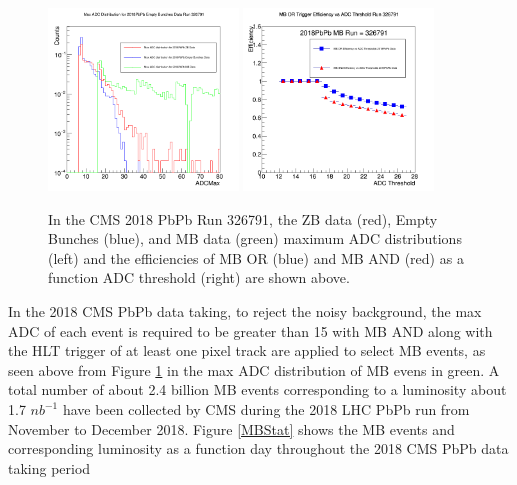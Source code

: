 \begin{figure}[hbtp]
\begin{center}
\includegraphics[width=0.45\textwidth]{Figures/Chapter3/MaxADC.png}
\includegraphics[width=0.45\textwidth]{Figures/Chapter3/MBTrgEffADC.png}
\caption{In the CMS 2018 PbPb Run 326791, the ZB data (red), Empty Bunches (blue), and MB data (green) maximum ADC distributions (left) and the efficiencies of MB OR (blue) and MB AND (red) as a function ADC threshold (right) are shown above.}
\label{2018PbPbMB}
\end{center}
\end{figure} 

In the 2018 CMS PbPb data taking, to reject the noisy background, the max ADC of each event is required to be greater than 15 with MB AND along with the HLT trigger of at least one pixel track are applied to select MB events, as seen above from Figure \ref{2018PbPbMB} in the max ADC distribution of MB evens in green. A total number of about 2.4 billion MB events corresponding to a luminosity about 1.7 $nb^{-1}$ have been collected by CMS during the 2018 LHC PbPb run from November to December 2018. Figure \ref{MBStat} shows the MB events and corresponding luminosity as a function day throughout the 2018 CMS PbPb data taking period

